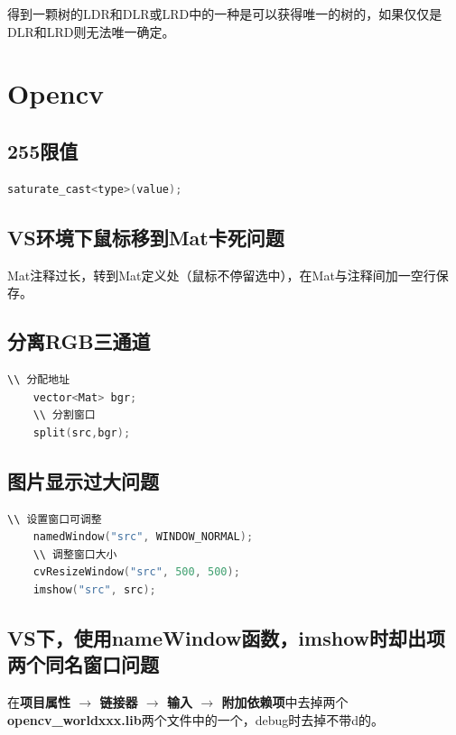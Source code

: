 \documentclass[12pt,twoside]{report}
\begin{document}
得到一颗树的LDR和DLR或LRD中的一种是可以获得唯一的树的，如果仅仅是DLR和LRD则无法唯一确定。

\chapter{Opencv}
\section{255限值}
\begin{lstlisting}[language=C]
    saturate_cast<type>(value);
\end{lstlisting}

\section{VS环境下鼠标移到Mat卡死问题}
Mat注释过长，转到Mat定义处（鼠标不停留选中），在Mat与注释间加一空行保存。

\section{分离RGB三通道}

\begin{lstlisting}[language=C]
    \\ 分配地址
    vector<Mat> bgr;
    \\ 分割窗口
    split(src,bgr); 
\end{lstlisting}

\section{图片显示过大问题}

\begin{lstlisting}[language=C]
    \\ 设置窗口可调整
    namedWindow("src", WINDOW_NORMAL); 
    \\ 调整窗口大小
    cvResizeWindow("src", 500, 500);
    imshow("src", src);   
\end{lstlisting}

\section{VS下，使用nameWindow函数，imshow时却出项两个同名窗口问题}

在\textbf{项目属性 $\rightarrow$ 链接器 $\rightarrow$ 输入 $\rightarrow$ 附加依赖项}中去掉两个\textbf{opencv\_worldxxx.lib}两个文件中的一个，debug时去掉不带d的。
\end{document}
